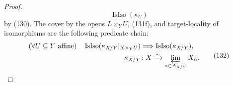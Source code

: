 \begin{proof}
\[    \operatorname{IsIso}(\kappa_U)                              \tag{131f}
  \]
  by (130).  The cover by the opens $L\times_YU$, (131f), and target-locality
  of isomorphisms are the following predicate chain:
  \[
  \begin{aligned}
    (\forall U\subseteq Y\text{ affine})\quad
      \operatorname{IsIso}
        (\kappa_{X/Y}|_{X\times_YU})
      &\Longrightarrow \operatorname{IsIso}(\kappa_{X/Y}),\\
    \kappa_{X/Y}&\colon X\xrightarrow{\sim}
      \varprojlim_{\alpha\in A_{X/Y}}X_\alpha.
  \end{aligned}                                                   \tag{132}
  \]
\end{proof}

\begin{definition}
  \label{def:nagata-finite-type-fp-model-system}
  \lean{}


\end{definition}
